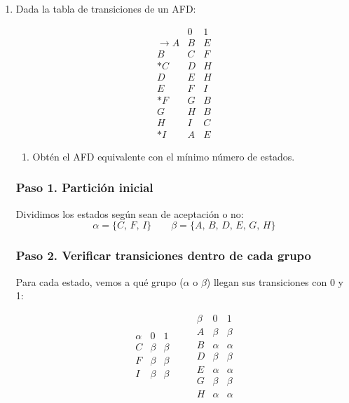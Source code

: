 \documentclass[12pt,letterpaper]{article}
\begin{document}
\thispagestyle{empty}


\newpage

\begin{enumerate}[label=\arabic*.]

\item Dada la tabla de transiciones de un AFD:

  \[
  \begin{array}{c|cc}
    & 0 & 1 \\ \hline
    \rightarrow A & B & E \\
    B & C & F \\
    * C & D & H \\
    D & E & H \\
    E & F & I \\
    * F & G & B \\
    G & H & B \\
    H & I & C \\
    * I & A & E
  \end{array}
  \]

  \begin{enumerate}
  \item Obtén el AFD equivalente con el mínimo número de estados.
  \end{enumerate}

  \bigskip

  \subsubsection*{Paso 1. Partición inicial}
  Dividimos los estados según sean de aceptación o no:
  \[
  \alpha = \{C,\, F,\, I\} \qquad \beta = \{A,\, B,\, D,\, E,\, G,\, H\}
  \]

  \subsubsection*{Paso 2. Verificar transiciones dentro de cada grupo}
  Para cada estado, vemos a qué grupo ($\alpha$ o $\beta$) llegan sus transiciones con 0 y 1:

  \[
  \begin{array}{c|cc}
    \alpha & 0 & 1 \\ \hline
    C & \beta & \beta \\
    F & \beta & \beta \\
    I & \beta & \beta
  \end{array}
  \qquad
  \begin{array}{c|cc}
    \beta & 0 & 1 \\ \hline
    A & \beta & \beta \\
    B & \alpha & \alpha \\
    D & \beta & \beta \\
    E & \alpha & \alpha \\
    G & \beta & \beta \\
    H & \alpha & \alpha
  \end{array}
  \]


\end{enumerate}
\end{document}

